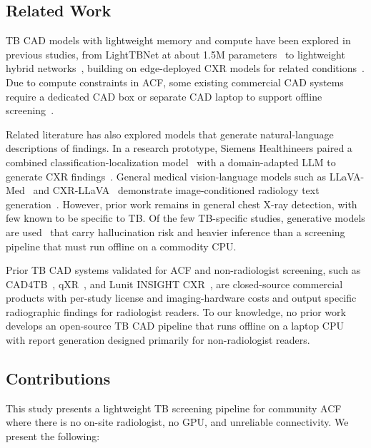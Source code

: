 \documentclass[conference, letterpaper]{IEEEtran}
\begin{document}
\subsection{Related Work}

TB CAD models with lightweight memory and compute have been explored in previous studies, from LightTBNet at about 1.5M parameters~\cite{capellan2023lighttbnet} to lightweight hybrid networks~\cite{owda2025hybrid_tb}, building on edge-deployed CXR models for related conditions~\cite{benmalek2025edge, chauhan2024covid_edge}. Due to compute constraints in ACF, some existing commercial CAD systems require a dedicated CAD box or separate CAD laptop to support offline screening~\cite{stoptb_cad_guide}.

Related literature has also explored models that generate natural-language descriptions of findings. In a research prototype, Siemens Healthineers paired a combined classification-localization model~\cite{ghesu2022ssl_medical} with a domain-adapted LLM to generate CXR findings~\cite{siemens_llm_cxr_2023}. General medical vision-language models such as LLaVA-Med~\cite{li2023llava_med} and CXR-LLaVA~\cite{lee2024cxr_llava} demonstrate image-conditioned radiology text generation~\cite{bazi2024vlm_review}. However, prior work remains in general chest X-ray detection, with few known to be specific to TB. Of the few TB-specific studies, generative models are used~\cite{ganapthy2025tb_vlm} that carry hallucination risk and heavier inference than a screening pipeline that must run offline on a commodity CPU.

Prior TB CAD systems validated for ACF and non-radiologist screening, such as CAD4TB~\cite{cad4tb_product}, qXR~\cite{qxr_docs}, and Lunit INSIGHT CXR~\cite{lunit_product}, are closed-source commercial products with per-study license and imaging-hardware costs and output specific radiographic findings for radiologist readers. To our knowledge, no prior work develops an open-source TB CAD pipeline that runs offline on a laptop CPU with report generation designed primarily for non-radiologist readers.

\subsection{Contributions}

This study presents a lightweight TB screening pipeline for community ACF where there is no on-site radiologist, no GPU, and unreliable connectivity. We present the following:
\end{document}
